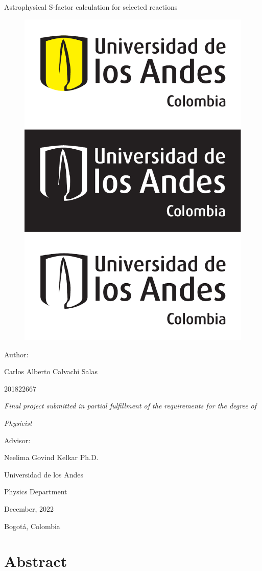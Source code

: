 \documentclass[openany]{book}
\begin{document}
		\begin{titlepage}
		\centering
		
		{\Huge Astrophysical S-factor calculation for selected reactions  \par}
		
		\begin{figure}[H]
			\centering
			\includegraphics[width=0.5\linewidth]{logo.pdf}
			\label{fig:logo}
		\end{figure}
		{\Large Author:  \par}
		{\Large Carlos Alberto Calvachi Salas \par}
		{\Large 201822667 \par}
		\vfill
		{\Large\textit{Final project submitted in partial fulfillment of the requirements for the degree of} \par}
		\vfill
		{\Large\textit{Physicist} \par}
		\vfill
		{\Large Advisor:  \par}
		{\Large Neelima Govind Kelkar Ph.D. \par}
		\vfill
		{\Large Universidad de los Andes  \par}
		{\Large Physics Department  \par}
		{\Large December, 2022  \par}
		{\Large Bogotá, Colombia \par}
	\end{titlepage}

\chapter*{Abstract}
\end{document}
